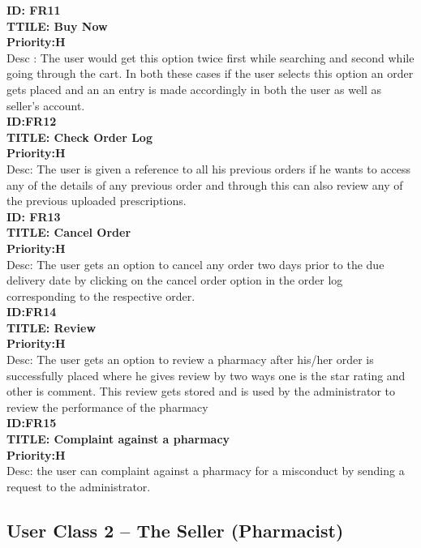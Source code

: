 \documentclass{scrreprt}
\begin{document}
\textbf{ID: FR11} \\
\textbf{TTILE: Buy Now} \\
\textbf{Priority:H}  \\
Desc : The user would get this option twice first while searching and second while going through the cart. In both these cases if the user selects this option an order gets placed and an an entry is made accordingly in both the user as well as seller’s account.  \\

\textbf{ID:FR12}  \\
\textbf{TITLE: Check Order Log}  \\
\textbf{Priority:H}  \\
Desc: The user is given a reference to all his previous orders if he wants to access any of the details of any previous order and through this can also review any of the previous uploaded prescriptions.  \\

\textbf{ID: FR13}  \\
\textbf{TITLE: Cancel Order}  \\
\textbf{Priority:H}  \\
Desc: The user gets an option to cancel any order two days prior to the due delivery date by clicking on the cancel order option in the order log corresponding to the respective order.  \\

\textbf{ID:FR14}  \\
\textbf{TITLE: Review} \\
\textbf{Priority:H}  \\
Desc: The user gets an option to review a pharmacy after his/her order is successfully placed where he gives review by two ways one is the star rating and other is comment. This review gets stored and is used by the administrator to review the performance of the pharmacy  \\

\textbf{ID:FR15}                                                 \\
\textbf{TITLE: Complaint against a pharmacy}                     \\
\textbf{Priority:H}                                              \\
Desc: the user can complaint against a pharmacy for a misconduct by sending a request to the administrator.




\subsection{User Class 2 – The Seller (Pharmacist)}  
 
\end{document}
